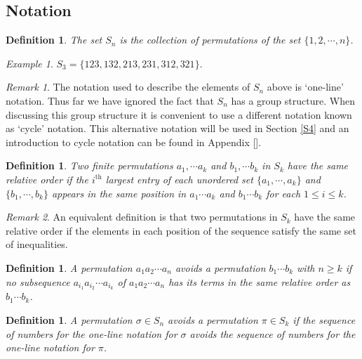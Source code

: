 \documentclass[11pt,letterpaper,twoside,english]{article}
\theoremstyle{theorem}
\newtheorem{definition}[theorem]{Definition}
\theoremstyle{remark}
\newtheorem{remark}{Remark}
\newtheorem{example}{Example}
\begin{document}
\subsection{Notation}

\begin{definition}
The set $S_n$ is the collection of permutations of the set $\{1,2,\cdots, n\}$. 
\end{definition}

\begin{example}
$S_3=\{123,132,213,231,312,321\}$. 
\end{example}

\begin{remark}
The notation used to describe the elements of $S_n$ above is `one-line' notation. Thus far we have ignored the fact that $S_n$ has a group structure. When discussing this group structure it is convenient to use a different notation known as `cycle' notation. This alternative notation will be used in Section \ref{S4} and an introduction to cycle notation can be found in Appendix []. 
\end{remark}

\begin{definition}
Two finite permutations $a_1,\cdots a_k$ and $b_1,\cdots b_k$ in $S_k$ have the same relative order if the $i^\text{th}$ largest entry of each unordered set $\{a_1,\cdots,a_k\}$ and $\{b_1,\cdots, b_k\}$ appears in the same position in $a_1\cdots a_k$ and $b_1\cdots b_k$ for each $1\le i\le k$. 
\end{definition}

\begin{remark}
An equivalent definition is that two permutations in $S_k$ have the same relative order if the elements in each position of the sequence satisfy the same set of inequalities. 
\end{remark}

\begin{definition}
A permutation $a_1a_2\cdots a_n$ avoids a permutation $b_1\cdots b_k$ with $n\ge k$ if no subsequence $a_{i_1}a_{i_2}\cdots a_{i_k}$ of $a_1a_2\cdots a_n$ has its terms in the same relative order as $b_1\cdots b_k$. 
\end{definition}



\begin{definition} 
A permutation $\sigma\in S_n$ avoids a permutation $\pi\in S_k$ if the sequence of numbers for the one-line notation for $\sigma$ avoids the sequence of numbers for the one-line notation for $\pi$.
\end{definition}
\end{document}

